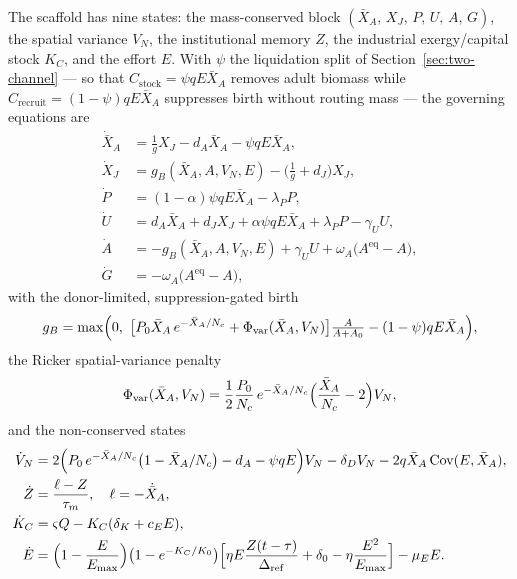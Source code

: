 \documentclass[twocolumn,10pt]{article}
\begin{document}
The scaffold has nine states: the mass-conserved block $(\bar X_A,\,X_J,\,P,\,U,\,A,\,G)$, the spatial variance $V_N$, the institutional memory $Z$, the industrial exergy/capital stock $K_C$, and the effort $E$. With $\psi$ the liquidation split of Section~\ref{sec:two-channel} --- so that $C_{\mathrm{stock}}=\psi qE\bar X_A$ removes adult biomass while $C_{\mathrm{recruit}}=(1-\psi)qE\bar X_A$ suppresses birth without routing mass --- the governing equations are
\begin{align}
\dot{\bar X}_A &= \tfrac{1}{g}X_J - d_A\bar X_A - \psi qE\bar X_A, \label{eq:scaf-XA}\\
\dot X_J &= g_B(\bar X_A,A,V_N,E) - \bigl(\tfrac{1}{g}+d_J\bigr)X_J, \label{eq:scaf-XJ}\\
\dot P &= (1-\alpha)\psi qE\bar X_A - \lambda_P P, \label{eq:scaf-P}\\
\dot U &= d_A\bar X_A + d_J X_J + \alpha\psi qE\bar X_A + \lambda_P P - \gamma_U U, \label{eq:scaf-U}\\
\dot A &= -g_B(\bar X_A,A,V_N,E) + \gamma_U U + \omega_A\bigl(A^{\mathrm{eq}}-A\bigr), \label{eq:scaf-A}\\
\dot G &= -\omega_A\bigl(A^{\mathrm{eq}}-A\bigr), \label{eq:scaf-G}
\end{align}
with the donor-limited, suppression-gated birth
\begin{equation}
g_B = \max\Bigl(0,\ \bigl[P_0\bar X_A\,e^{-\bar X_A/N_c} + \Phi_{\mathrm{var}}(\bar X_A,V_N)\bigr]\tfrac{A}{A+A_0} - (1-\psi)qE\bar X_A\Bigr),
\label{eq:scaf-gB}
\end{equation}
the Ricker spatial-variance penalty
\begin{equation}
\Phi_{\mathrm{var}}(\bar X_A,V_N) = \frac{1}{2}\frac{P_0}{N_c}\,e^{-\bar X_A/N_c}\Bigl(\frac{\bar X_A}{N_c}-2\Bigr)V_N,
\label{eq:scaf-var}
\end{equation}
and the non-conserved states
\begin{align}
\dot V_N &= 2\Bigl(P_0\,e^{-\bar X_A/N_c}\bigl(1-\bar X_A/N_c\bigr) - d_A - \psi qE\Bigr)V_N - \delta_D V_N - 2q\bar X_A\,\mathrm{Cov}(E,\bar X_A),
\label{eq:scaf-V}\\
\dot Z &= \frac{\ell - Z}{\tau_m},\quad \ell = -\dot{\bar X}_A,
\label{eq:scaf-Z}\\
\dot K_C &= \varsigma Q - K_C(\delta_K + c_E E),
\label{eq:scaf-K}\\
\dot E &= \Bigl(1-\frac{E}{E_{\max}}\Bigr)\bigl(1-e^{-K_C/K_0}\bigr)\Bigl[\eta E\frac{Z(t-\tau)}{\Delta_{\mathrm{ref}}} + \delta_0 - \eta\frac{E^2}{E_{\max}}\Bigr] - \mu_E E.
\label{eq:scaf-E}
\end{align}
\end{document}
